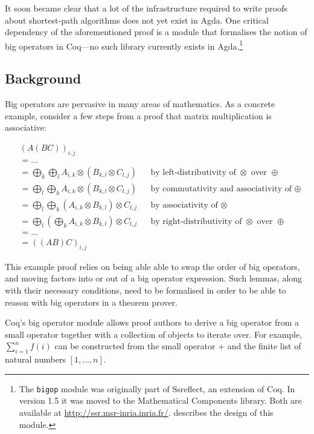 \documentclass[a4paper]{scrartcl}
\begin{document}
It soon became clear that a lot of the infrastructure required to write proofs about shortest-path algorithms does not yet exist in Agda.
One critical dependency of the aforementioned proof is a module that formalises the notion of big operators in Coq---no such library currently exists in Agda.\footnote{The \texttt{bigop} module was originally part of Ssreflect, an extension of Coq. In version 1.5 it was moved to the Mathematical Components library. Both are available at \url{http://ssr.msr-inria.inria.fr/}. \autocite{bertot_canonical_2008} describes the design of this module.}

\subsection{Background}

Big operators are pervasive in many areas of mathematics. As a concrete example, consider a few steps from a proof that matrix multiplication is associative:

\begin{align*}
&\left(A \left(B C\right)\right)_{i,j} \\
&= \dots \\
&= \bigoplus_k \bigoplus_l  A_{i,k} \otimes \left( B_{k,l} \otimes C_{l,j} \right)
  && \text{by left-distributivity of \(\otimes\) over \(\oplus\)} \\
&= \bigoplus_l \bigoplus_k  A_{i,k} \otimes \left( B_{k,l} \otimes C_{l,j} \right)
  && \text{by commutativity and associativity of \(\oplus\)} \\
&= \bigoplus_l \bigoplus_k \left( A_{i,k} \otimes B_{k,l} \right) \otimes C_{l,j}
  && \text{by associativity of \(\otimes\)} \\
&= \bigoplus_l \left( \bigoplus_k A_{i,k} \otimes B_{k,l} \right) \otimes C_{l,j}
  && \text{by right-distributivity of \(\otimes\) over \(\oplus\)} \\
&= \dots \\
&= \left( \left( A  B \right) C\right)_{i,j}
\end{align*}

This example proof relies on being able able to swap the order of big operators, and moving factors into or out of a big operator expression. Such lemmas, along with their necessary conditions, need to be formalised in order to be able to reason with big operators in a theorem prover.

Coq's big operator module allows proof authors to derive a big operator from a small operator together with a collection of objects to iterate over. For example, \(\sum_{i=1}^n f(i)\) can be constructed from the small operator \(+\) and the finite list of natural numbers \([1, \dots, n]\).
\end{document}
